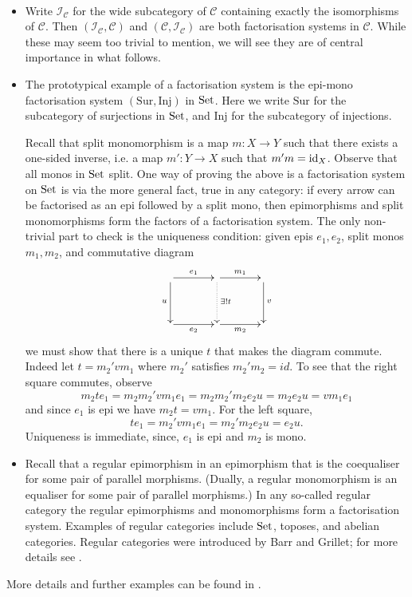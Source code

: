 \begin{examples} \label{ex.factsysts}\ 

  \begin{itemize}
    \item Write $\mathcal I_{\mathcal C}$ for the wide subcategory of
      $\mathcal C$ containing exactly the isomorphisms of $\mathcal C$. Then
      $(\mathcal I_{\mathcal C}, \mathcal C)$ and $(\mathcal C, \mathcal
      I_{\mathcal C})$ are both factorisation systems in $\mathcal C$. While
      these may seem too trivial to mention, we will see they are of central
      importance in what follows.
    
    \item The prototypical example of a factorisation system is the epi-mono
      factorisation system $(\mathrm{Sur},\mathrm{Inj})$ in $\mathrm{Set}$. Here we
      write $\mathrm{Sur}$ for the subcategory of surjections in $\mathrm{Set}$, and
      $\mathrm{Inj}$ for the subcategory of injections. 
      
      Recall that split monomorphism is a map $m\colon X\to Y$ such that there
      exists a one-sided inverse, i.e. a map $m'\colon Y\to X$ such that
      $m'm=\mathrm{id}_X$. Observe that all monos in $\mathrm{Set}$ split.  One way of proving
      the above is a factorisation system on $\mathrm{Set}$ is via the more general
      fact, true in any category: if every arrow can be factorised as an epi
      followed by a split mono, then epimorphisms and split monomorphisms form
      the factors of a factorisation system.  The only non-trivial part to check
      is the uniqueness condition: given epis $e_1,e_2$, split monos $m_1,m_2$,
      and commutative diagram
      \[
	\xymatrixcolsep{3pc}
	\xymatrixrowsep{3pc}
	\xymatrix{
	  \ar[r]^{e_1} \ar[d]_u & \ar[r]^{m_1} \ar@{.>}[d]^{\exists! t} &
	  \ar[d]^v \\
	  \ar[r]_{e_2}& \ar[r]_{m_2} & 
	}
      \]
      we must show that there is a unique $t$ that makes the diagram commute.
      Indeed let $t= m_2'vm_1$ where $m_2'$ satisfies $m_2'm_2=id$. 
      To see that the right square commutes, observe
      \[
	m_2 t e_1 =  m_2 m_2' v m_1 e_1 = m_2 m_2' m_2 e_2 u = m_2 e_2 u = v m_1 e_1
      \]
      and since $e_1$ is epi we have $m_2 t = v m_1$. For the left square,
      \[
	t e_1 = m_2' v m_1 e_1 = m_2' m_2 e_2 u = e_2 u.
      \] 
      Uniqueness is immediate, since, $e_1$ is epi and $m_2$ is mono. 
    
    \item Recall that a regular epimorphism in an epimorphism that is the
      coequaliser for some pair of parallel morphisms. (Dually, a regular
      monomorphism is an equaliser for some pair of parallel morphisms.) In any
      so-called regular category the regular epimorphisms and monomorphisms form
      a factorisation system.  Examples of regular categories include $\mathrm{Set}$,
      toposes, and abelian categories. Regular categories were introduced by
      Barr and Grillet; for more details see \cite{Bar71,Gri71}.
\end{itemize}
More details and further examples can be found in \cite[]{AHS}.
\end{examples}

